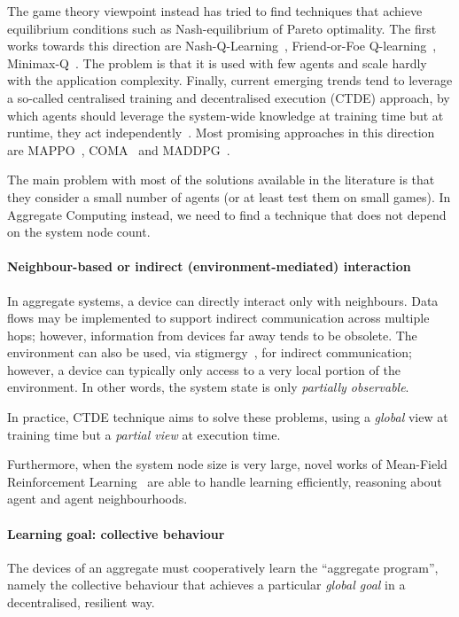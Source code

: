 \documentclass[conference]{IEEEtran}
\begin{document}
The game theory viewpoint instead has tried to find techniques that achieve equilibrium conditions such as Nash-equilibrium of Pareto optimality.
 The first works towards this direction are Nash-Q-Learning~\cite{nash-q}, Friend-or-Foe Q-learning~\cite{DBLP:conf/icml/Littman01}, Minimax-Q~\cite{DBLP:conf/icml/Littman94}.
The problem is that it is used with few agents and scale hardly with the application complexity.
%
Finally, current emerging trends tend to leverage a so-called centralised training and decentralised execution (CTDE) approach, by which 
 agents should leverage the system-wide knowledge at training time but at runtime, they act independently~\cite{DBLP:journals/aamas/Hernandez-LealK19}.
 Most promising approaches in this direction are MAPPO~\cite{DBLP:journals/corr/abs-2103-01955}, COMA~\cite{DBLP:journals/corr/FoersterFANW17} and MADDPG~\cite{DBLP:conf/nips/LoweWTHAM17}.
 
The main problem with most of the solutions available in the literature is that they consider a small number of agents (or at least test them on small games).
 In Aggregate Computing instead, we need to find a technique that does not depend on the system node count.

\paragraph{Neighbour-based or indirect (environment-mediated) interaction}
%
In aggregate systems, a device can directly interact only with neighbours.
%
Data flows may be implemented
 to support indirect communication across multiple hops;
 however, information from devices far away tends to be obsolete.
%
The environment can also be used, via stigmergy~\cite{DBLP:journals/scp/NicolaSI20},
 for indirect communication;
 however, a device can typically only access 
  to a very local portion of the environment.
%
In other words, the system state is only \emph{partially observable}.

In practice, CTDE technique aims to solve these problems, using a \emph{global} view at training time but
 a \emph{partial view} at execution time.

Furthermore, when the system node size is very large, novel works of Mean-Field Reinforcement Learning~\cite{DBLP:conf/ijcnn/ZhouZX21} are able to
 handle learning efficiently, reasoning about agent and agent neighbourhoods.
%
\paragraph{Learning goal: collective behaviour}
%
The devices of an aggregate 
 must cooperatively learn the ``aggregate program'',
 namely the collective behaviour 
 that achieves a particular \emph{global goal}
 in a decentralised, resilient way.
%
\end{document}

